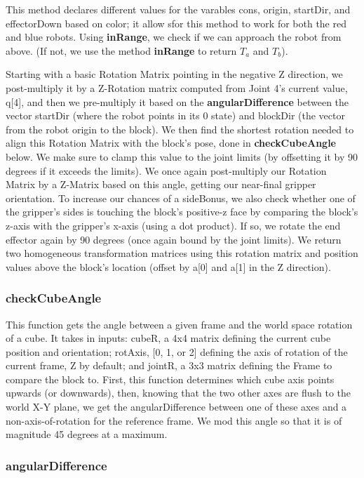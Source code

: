 \documentclass{article}
\begin{document}
    This method declares different values for the varables cons, origin, startDir, and effectorDown based on color; it allow sfor this method to work for both the red and blue robots. Using \textbf{inRange}, we check if we can approach the robot from above. (If not, we use the method \textbf{inRange} to return $T_a$ and $T_b$).
    
    Starting with a basic Rotation Matrix pointing in the negative Z direction, we post-multiply it by a Z-Rotation matrix computed from Joint 4’s current value, q[4], and then we pre-multiply it based on the \textbf{angularDifference} between the vector startDir (where the robot points in its 0 state) and blockDir (the vector from the robot origin to the block).  We then find the shortest rotation needed to align this Rotation Matrix with the block’s pose, done in \textbf{ checkCubeAngle} below. We make sure to clamp this value to the joint limits (by offsetting it by 90 degrees if it exceeds the limits). We once again post-multiply our Rotation Matrix by a Z-Matrix based on this angle, getting our near-final gripper orientation. To increase our chances of a sideBonus, we also check whether one of the gripper’s sides is touching the block’s positive-z face by comparing the block’s z-axis with the gripper’s x-axis (using a dot product). If so, we rotate the end effector again by 90 degrees (once again bound by the joint limits). We return two homogeneous transformation matrices using this rotation matrix and position values above the block’s location (offset by a[0] and a[1] in the Z direction).
    
    \subsubsection{checkCubeAngle}
    This function gets the angle between a given frame and the world space rotation of a cube. It takes in inputs: cubeR, a 4x4 matrix defining the current cube position and orientation; rotAxis, [0, 1, or 2] defining the axis of rotation of the current frame, Z by default; and jointR, a 3x3 matrix defining the Frame to compare the block to. First, this function determines which cube axis points upwards (or downwards), then, knowing that the two other axes are flush to the world X-Y plane, we get the angularDifference between one of these axes and a non-axis-of-rotation for the reference frame. We mod this angle so that it is of magnitude 45 degrees at a maximum.
    
    \subsubsection{angularDifference}
    
\end{document}
